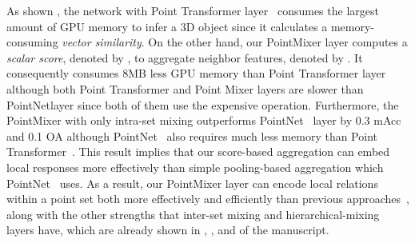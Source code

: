 \begin{table}[!h]
\centering
\caption{A comparison of efficiency.
}
\vspace{-3mm}
\label{table:efficiency}
\end{table}






%
 
As shown , the network with Point Transformer layer~\cite{point-transformer} consumes the largest amount of GPU memory to infer a 3D object since it calculates a memory-consuming \textit{vector similarity}.
On the other hand, our PointMixer layer computes a \textit{scalar score}, denoted by , to aggregate neighbor features, denoted by . It consequently consumes 8MB less GPU memory than Point Transformer layer~\cite{point-transformer} although both Point Transformer and Point Mixer layers are slower than PointNet\plusplus layer since both of them use the expensive  operation.
Furthermore, the PointMixer with only intra-set mixing outperforms PointNet\plusplus~\cite{pointnet++} layer by 0.3 mAcc and 0.1 OA although PointNet\plusplus~\cite{pointnet++} also requires much less memory than Point Transformer~\cite{point-transformer}.
This result implies that our score-based aggregation can embed local responses more effectively than simple pooling-based aggregation which PointNet\plusplus~\cite{pointnet++} uses.
As a result, our PointMixer layer can encode local relations within a point set both more effectively and efficiently than previous approaches~\cite{pointnet++,point-transformer}, along with the other strengths that inter-set mixing and hierarchical-mixing layers have, which are already shown in , , and  of the manuscript.



